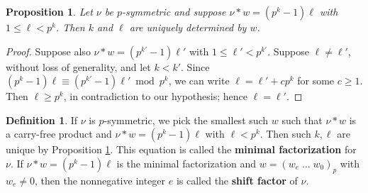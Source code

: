 \documentclass{amsart}
\numberwithin{equation}{section}
\theoremstyle{plain}
\newtheorem{proposition}[theorem]{Proposition}
\theoremstyle{definition}
\newtheorem{definition}[theorem]{Definition}
\begin{document}
\begin{proposition}
\label{P:determined}
Let $\nu$ be $p$-symmetric  and suppose
$\nu * w = (p^k-1)\ell$ with $1\le \ell<p^k$.
Then $k$ and $\ell$ are uniquely determined by $w$.
\end{proposition}

\begin{proof}
Suppose also $\nu*w=(p^{k'}-1)\ell'$ with $1\le \ell'<p^{k'}$.
Suppose $\ell\neq \ell'$, without loss of generality, and let $k< k'$. Since
$(p^k-1)\ell\equiv (p^{k'}-1)\ell'\bmod p^k$, we can write
$\ell=\ell'+cp^k$ for some $c\ge 1$. Then $\ell\ge p^k$, in contradiction to our hypothesis; hence $\ell=\ell'$.
\end{proof}

\begin{definition}\label{D:symmetric_number}
If $\nu$ is $p$-symmetric, we pick the smallest such $w$ 
such that $\nu * w$ is a carry-free product and $\nu * w = (p^k-1)\ell$
with $\ell<p^k$. Then such $k, \ell$ are unique
by Proposition \ref{P:determined}.
This equation is called the {\bf minimal factorization} for $\nu$.
If $\nu * w=(p^k-1)\ell$ is the minimal factorization
and $w = (w_e \; \dots \; w_0)_p$ with $w_e \ne 0$, then the nonnegative integer $e$
is called the {\bf shift factor} of $\nu$.
\end{definition}
\end{document}
